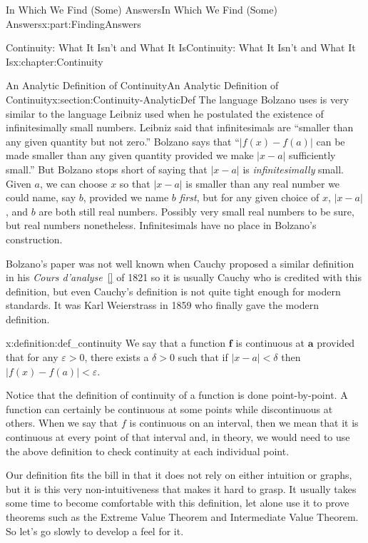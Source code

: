 \documentclass[oneside,10pt,]{book}
\newcommand{\xreffont}{\relax}
\numberwithin{equation}{section}
\newcommand{\abs}[1]{\left|#1\right|}
\newcommand{\eps}{\varepsilon}
\newcommand{\lt}{<}
\begin{document}
\begin{partptx}{In Which We Find (Some) Answers}{}{In Which We Find (Some) Answers}{}{}{x:part:FindingAnswers}
\begin{chapterptx}{Continuity: What It Isn't and What It Is}{}{Continuity: What It Isn't and What It Is}{}{}{x:chapter:Continuity}
\begin{sectionptx}{An Analytic Definition of Continuity}{}{An Analytic Definition of Continuity}{}{}{x:section:Continuity-AnalyticDef}
The language Bolzano uses is very similar to the language Leibniz  used when he postulated the existence of infinitesimally small numbers. Leibniz said that infinitesimals are ``smaller than any given quantity but not zero.'' Bolzano says that ``\(\abs{f(x)-f(a)}\) can be made smaller than any given quantity provided we make \(\abs{x-a}\) sufficiently small.'' But Bolzano stops short of saying that \(\abs{x-a}\) is \emph{infinitesimally} small.  Given \(a\), we can choose \(x\) so that \(\abs{x-a}\) is smaller than any real number we could name, say \(b\), provided we name \(b\) \emph{first}, but for any given choice of \(x\), \(\abs{x-a}\), and \(b\) are both still real numbers.  Possibly very small real numbers to be sure, but real numbers nonetheless.  Infinitesimals have no place in Bolzano's construction.%
\par
{} Bolzano's paper was not well known when Cauchy  proposed a similar definition in his \emph{Cours d'analyse}~\hyperlink{x:biblio:bradley09__cauch_cours}{[{\xreffont 1}]} of 1821 so it is usually Cauchy who is credited with this definition, but even Cauchy's definition is not quite tight enough for modern standards.  It was Karl Weierstrass in 1859 who finally gave the modern definition.%
\begin{definition}{}{x:definition:def_continuity}%
 We say that a function \(\boldsymbol{f}\) is continuous at \(\boldsymbol{a}\) provided that for any \(\eps>0\), there exists a \(\delta>0\) such that if \(\abs{x-a}\lt
\delta\) then \(|f(x)-f(a)|\lt \eps\).%
\end{definition}
Notice that the definition of continuity of a function is done point-by-point.  A function can certainly be continuous at some points while discontinuous at others.  When we say that \(f\) is continuous on an interval, then we mean that it is continuous at every point of that interval and, in theory, we would need to use the above definition to check continuity at each individual point.%
\par
{} Our definition fits the bill in that it does not rely on either intuition or graphs, but it is this very non-intuitiveness that makes it hard to grasp.  It usually takes some time to become comfortable with this definition, let alone use it to prove theorems such as the Extreme Value Theorem and Intermediate Value Theorem.  So let's go slowly to develop a feel for it.%

\end{sectionptx}
\end{chapterptx}
\end{partptx}
\end{document}
